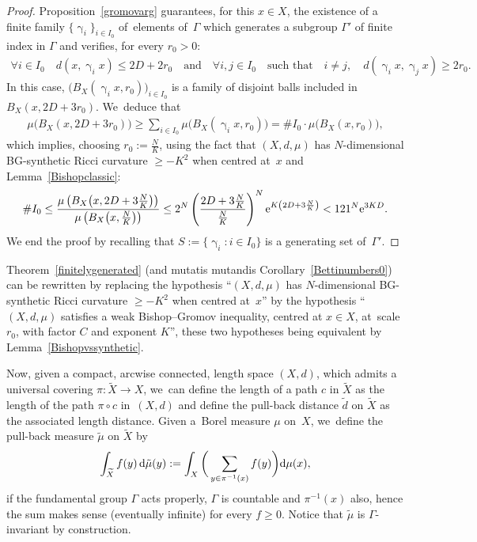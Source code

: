 \documentclass[pdftex]{sigma}
\numberwithin{equation}{section}
\newcommand{\f}{\rightarrow}
\newcommand{\g}{\operatorname{\gamma}}
\begin{document}
\begin{proof} Proposition~\ref{gromovarg} guarantees, for this $x \in X$,
the existence of a finite family
$\{\g_i\}_{i \in I_0}$ of~elements of~$\Gamma$ which generates a subgroup
$\Gamma'$ of finite index in $\Gamma$ and verifies, for every $r_0 > 0$:
\begin{gather*}
\forall i \in I_0\quad d(x, \g_i x) \le 2 D + 2 r_0 \quad \text{and} \quad \forall i, j \in I_0 \quad\text{such that}\quad i\ne j,\quad d(\g_i x, \g_j x) \ge 2 r_0.
\end{gather*}
In this case, $\big(B_X ( \g_i x, r_0)\big)_{i \in I_0}$ is a family of disjoint balls included in $B_X (x, 2 D + 3 r_0)$. We~deduce that
\begin{gather*}
\mu \big( B_X (x, 2 D + 3 r_0)\big) \ge \sum_{i \in I_0} \mu \big(B_X ( \g_i x, r_0)\big) = \# I_0 \cdot \mu \big(B_X ( x, r_0)\big),
\end{gather*}
which implies, choosing $r_0 := \frac{N}{K}$, using the fact that $(X,d,\mu)$ has $N$-dimensional BG-synthetic Ricci curvature $\ge -K^2$
when centred at~$x$ and Lemma~\ref{Bishopclassic}:
\begin{gather*}
\# I_0 \le \dfrac{\mu \left(B_X \big(x, 2 D + 3 \frac{N}{K}\big)\right)}{\mu \left(B_X \big(x, \frac{N}{K}\big)\right)} \le 2^N
\left(\dfrac{2 D + 3 \frac{N}{K}}{\frac{N}{K}}\right)^{N} {\rm e}^{K \left(2 D + 3 \frac{N}{K}\right)} < 121^N {\rm e}^{3 K D}.
\end{gather*}
We end the proof by recalling that $S := \{\g_i \colon i \in I_0\}$ is a generating set of~$\Gamma'$.
\end{proof}

Theorem~\ref{finitelygenerated} (and mutatis mutandis Corollary~\ref{Bettinumbers0}) can be rewritten by replacing the hypothesis
``$(X,d,\mu)$ has $N$-dimensional BG-synthetic Ricci curvature $\ge
-K^2$ when centred at~$x$'' by the hypothesis ``$(X,d,\mu)$ satisfies a weak
Bishop--Gromov inequality, centred at $x\in X$, at~scale $r_0$, with factor $C$ and exponent $K$'', these two hypotheses being equivalent by Lemma~\ref{Bishopvssynthetic}.

\medskip

Now, given a compact, arcwise connected, length space $(X, d)$, which admits a universal covering $\pi\colon \widetilde X \f X$, we~can define the length of a path $c$ in $\widetilde X$ as the length of
the path $\pi \circ c$ in~$(X,d)$ and define the pull-back distance $\tilde d$ on
$\widetilde X$ as the associated length distance. Given a~Borel measure $\mu$ on~$X$, we~define the pull-back measure $\tilde \mu$ on $\widetilde X$ by
\begin{gather*}
\int_{\widetilde X} f (y)\, {\rm d} \tilde \mu (y) := \int_{X} \bigg(\sum_{y \in \pi^{-1}(x)} f (y) \bigg) {\rm d} \mu (x),
\end{gather*}
if the fundamental group $\Gamma$ acts properly, $\Gamma$ is countable and $\pi^{-1}(x)$ also, hence the sum makes sense (eventually infinite)
for every $f\ge 0$. Notice that $\tilde \mu$ is $\Gamma$-invariant by construction.
\end{document}
